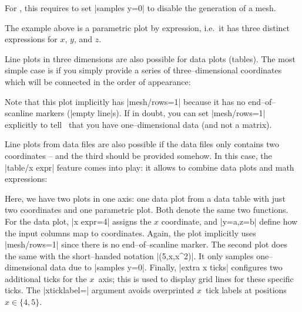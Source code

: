 {For , this requires to set |samples y=0| to disable the generation of a mesh.
\begin{codeexample}[]
\end{codeexample}
\noindent The example above is a parametric plot by expression, i.e.\ it has three distinct expressions for $x$, $y$, and $z$.

Line plots in three dimensions are also possible for data plots (tables). The most simple case is if you simply provide a series of three--dimensional coordinates which will be connected in the order of appearance:
\begin{codeexample}[]
\end{codeexample}
\noindent Note that this plot implicitly has |mesh/rows=1| because it has no end--of--scanline markers (|empty line|s). If in doubt, you can set |mesh/rows=1| explicitly to tell \PGFPlots\ that you have one--dimensional data (and not a matrix).

Line plots from data files are also possible if the data files only contains two coordinates -- and the third should be provided somehow. In this case, the |table/x expr| feature comes into play: it allows to combine data plots and math expressions:
\begin{codeexample}[]
\end{codeexample}
\noindent Here, we have two plots in one axis: one data plot from a data table with just two coordinates and one parametric plot. Both denote the same two functions. For the data plot, |x expr=4| assigns the $x$ coordinate, and |y=a,z=b| define how the input columns map to coordinates. Again, the plot implicitly uses |mesh/rows=1| since there is no end--of--scanline marker. The second plot does the same with the short--handed notation |(5,x,x^2)|. It only samples one--dimensional data due to |samples y=0|. Finally, |extra x ticks| configures two additional ticks for the $x$~axis; this is used to display grid lines for these specific ticks. The |xticklabel=\empty| argument avoids overprinted $x$~tick labels at positions $x\in\{4,5\}$.


}

